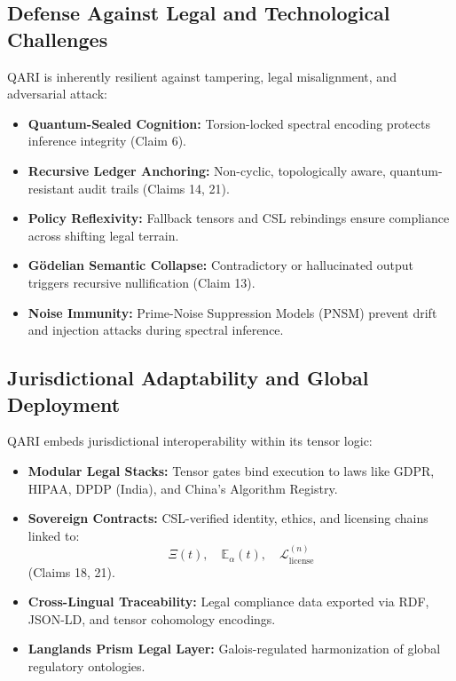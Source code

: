 \documentclass[12pt]{article}
\begin{document}
\subsection{Defense Against Legal and Technological Challenges}

QARI is inherently resilient against tampering, legal misalignment, and adversarial attack:

\begin{itemize}
    \item \textbf{Quantum-Sealed Cognition:} Torsion-locked spectral encoding protects inference integrity (Claim 6).

    \item \textbf{Recursive Ledger Anchoring:} Non-cyclic, topologically aware, quantum-resistant audit trails (Claims 14, 21).

    \item \textbf{Policy Reflexivity:} Fallback tensors and CSL rebindings ensure compliance across shifting legal terrain.

    \item \textbf{Gödelian Semantic Collapse:} Contradictory or hallucinated output triggers recursive nullification (Claim 13).

    \item \textbf{Noise Immunity:} Prime-Noise Suppression Models (PNSM) prevent drift and injection attacks during spectral inference.
\end{itemize}

\subsection{Jurisdictional Adaptability and Global Deployment}

QARI embeds jurisdictional interoperability within its tensor logic:

\begin{itemize}
    \item \textbf{Modular Legal Stacks:} Tensor gates bind execution to laws like GDPR, HIPAA, DPDP (India), and China's Algorithm Registry.

    \item \textbf{Sovereign Contracts:} CSL-verified identity, ethics, and licensing chains linked to:
    \[
        \Xi(t), \quad \mathbb{E}_\alpha(t), \quad \mathcal{L}^{(n)}_{\text{license}}
    \]
    (Claims 18, 21).

    \item \textbf{Cross-Lingual Traceability:} Legal compliance data exported via RDF, JSON-LD, and tensor cohomology encodings.

    \item \textbf{Langlands Prism Legal Layer:} Galois-regulated harmonization of global regulatory ontologies.
\end{itemize}
\end{document}
